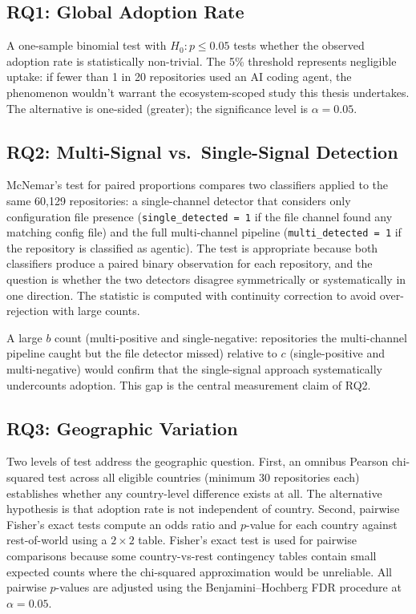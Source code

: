 \subsection{RQ1: Global Adoption Rate}

A one-sample binomial test with $H_0: p \leq 0.05$ tests whether the observed adoption rate is statistically non-trivial. The 5\% threshold represents negligible uptake: if fewer than 1 in 20 repositories used an AI coding agent, the phenomenon wouldn't warrant the ecosystem-scoped study this thesis undertakes. The alternative is one-sided (greater); the significance level is $\alpha = 0.05$.

\subsection{RQ2: Multi-Signal vs.\ Single-Signal Detection}

McNemar's test for paired proportions compares two classifiers applied to the same 60,129 repositories: a single-channel detector that considers only configuration file presence (\texttt{single\_detected = 1} if the file channel found any matching config file) and the full multi-channel pipeline (\texttt{multi\_detected = 1} if the repository is classified as agentic). The test is appropriate because both classifiers produce a paired binary observation for each repository, and the question is whether the two detectors disagree symmetrically or systematically in one direction. The statistic is computed with continuity correction to avoid over-rejection with large counts.

A large $b$ count (multi-positive and single-negative: repositories the multi-channel pipeline caught but the file detector missed) relative to $c$ (single-positive and multi-negative) would confirm that the single-signal approach systematically undercounts adoption. This gap is the central measurement claim of RQ2.

\subsection{RQ3: Geographic Variation}

Two levels of test address the geographic question. First, an omnibus Pearson chi-squared test across all eligible countries (minimum 30 repositories each) establishes whether any country-level difference exists at all. The alternative hypothesis is that adoption rate is not independent of country. Second, pairwise Fisher's exact tests compute an odds ratio and $p$-value for each country against rest-of-world using a $2 \times 2$ table. Fisher's exact test is used for pairwise comparisons because some country-vs-rest contingency tables contain small expected counts where the chi-squared approximation would be unreliable. All pairwise $p$-values are adjusted using the Benjamini--Hochberg FDR procedure at $\alpha = 0.05$.

